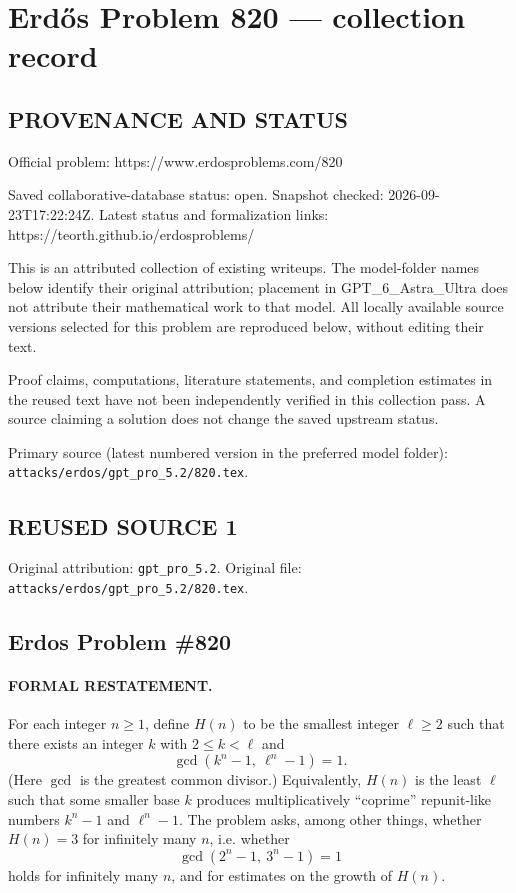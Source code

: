 \section*{Erd\H{o}s Problem 820 --- collection record}

\subsection*{PROVENANCE AND STATUS}
Official problem: https://www.erdosproblems.com/820

Saved collaborative-database status: open.
Snapshot checked: 2026-09-23T17:22:24Z.
Latest status and formalization links: https://teorth.github.io/erdosproblems/

This is an attributed collection of existing writeups. The model-folder names below identify their original attribution; placement in GPT\_6\_Astra\_Ultra does not attribute their mathematical work to that model. All locally available source versions selected for this problem are reproduced below, without editing their text.

Proof claims, computations, literature statements, and completion estimates in the reused text have not been independently verified in this collection pass. A source claiming a solution does not change the saved upstream status.

Primary source (latest numbered version in the preferred model folder): \texttt{attacks/erdos/gpt\_pro\_5.2/820.tex}.

\subsection*{REUSED SOURCE 1}
Original attribution: \texttt{gpt\_pro\_5.2}.
Original file: \texttt{attacks/erdos/gpt\_pro\_5.2/820.tex}.

\subsection*{Erdos Problem \#820}

\paragraph{FORMAL RESTATEMENT.}
For each integer $n\ge1$, define $H(n)$ to be the smallest integer $\ell\ge2$ such that there exists an integer $k$ with $2\le k<\ell$ and
\[
\gcd(k^n-1,\ \ell^n-1)=1.
\]
(Here $\gcd$ is the greatest common divisor.)
Equivalently, $H(n)$ is the least $\ell$ such that some smaller base $k$ produces multiplicatively ``coprime'' repunit-like numbers $k^n-1$ and $\ell^n-1$.
The problem asks, among other things, whether $H(n)=3$ for infinitely many $n$, i.e. whether
\[
\gcd(2^n-1,\ 3^n-1)=1
\]
holds for infinitely many $n$, and for estimates on the growth of $H(n)$.

